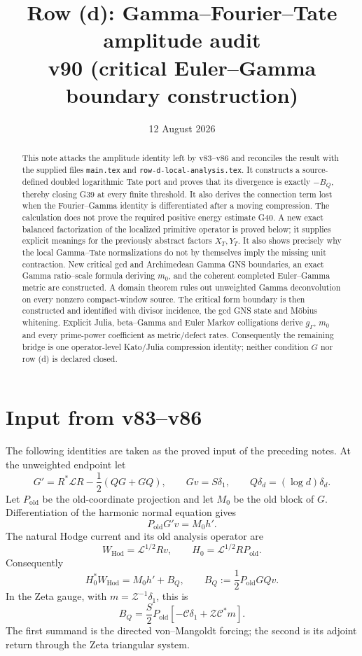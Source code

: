 \documentclass[11pt]{article}
\title{Row (d): Gamma--Fourier--Tate amplitude audit\\
v90 (critical Euler--Gamma boundary construction)}
\author{}
\date{12 August 2026}
\newcommand{\old}{\mathrm{old}}
\newcommand{\Hod}{\mathrm{Hod}}
\newcommand{\cC}{\mathscr C}
\newcommand{\cZ}{\mathscr Z}
\newcommand{\cL}{\mathscr L}
\begin{document}
\maketitle

\begin{abstract}
This note attacks the amplitude identity left by v83--v86 and reconciles the
result with the supplied files \texttt{main.tex} and
\texttt{row-d-local-analysis.tex}.  It constructs a
source-defined doubled logarithmic Tate port and proves that its divergence is
exactly $-B_Q$, thereby closing G39 at every finite threshold.  It also derives
the connection term lost when the Fourier--Gamma identity is differentiated
after a moving compression.  The calculation does not prove the required
positive energy estimate G40.  A new exact balanced factorization of the
localized primitive operator is proved below; it supplies explicit meanings
for the previously abstract factors $X_T,Y_T$.  It also shows precisely why
the local Gamma--Tate normalizations do not by themselves imply the missing
unit contraction.  New critical gcd and Archimedean Gamma GNS boundaries,
an exact Gamma ratio--scale formula deriving $m_0$, and the coherent completed
Euler--Gamma metric are constructed.  A domain theorem rules out unweighted
Gamma deconvolution on every nonzero compact-window source.  The critical
form boundary is then constructed and identified with divisor incidence, the
gcd GNS state and M\"obius whitening.  Explicit Julia, beta--Gamma and Euler
Markov colligations derive $g_\Gamma$, $m_0$ and every prime-power coefficient
as metric/defect rates.  Consequently the remaining bridge is one
operator-level Kato/Julia compression identity; neither condition $G$ nor
row (d) is declared closed.
\end{abstract}

\section{Input from v83--v86}

The following identities are taken as the proved input of the preceding
notes.  At the unweighted endpoint let
\[
 G'=R^*\cL R-\frac12(QG+GQ),\qquad Gv=S\delta_1,
 \qquad Q\delta_d=(\log d)\delta_d .
\]
Let $P_{\old}$ be the old-coordinate projection and let $M_0$ be the old
block of $G$.  Differentiation of the harmonic normal equation gives
\begin{equation}
 P_{\old}G'v=M_0h'.                                      \tag{1}
\end{equation}
The natural Hodge current and its old analysis operator are
\[
 W_{\Hod}=\cL^{1/2}Rv,
 \qquad H_0=\cL^{1/2}RP_{\old}.
\]
Consequently
\begin{equation}
 H_0^*W_{\Hod}=M_0h'+B_Q,
 \qquad B_Q:=\frac12P_{\old}GQv.                         \tag{2}
\end{equation}
In the Zeta gauge, with $m=\cZ^{-1}\delta_1$, this is
\begin{equation}
 B_Q=\frac S2P_{\old}
 \left[-\cC\delta_1+\cZ\cC^*m\right].                  \tag{3}
\end{equation}
The first summand is the directed von--Mangoldt forcing; the second is its
adjoint return through the Zeta triangular system.
\end{document}

